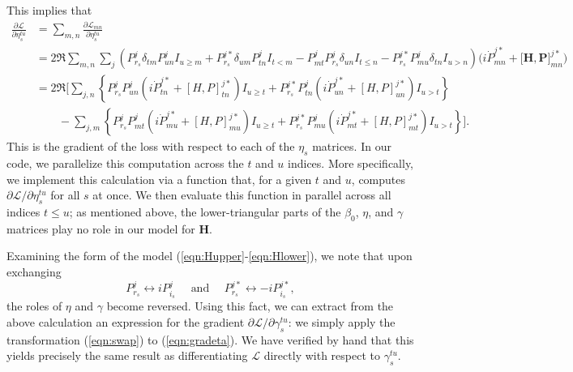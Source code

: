 \documentclass[10pt]{article}
\begin{document}
This implies that
\begin{subequations}
\label{eqn:gradeta}
\begin{align}
\frac{\partial \mathcal{L}}{\partial \eta_{s}^{tu}} &= \sum_{m,n} \frac{\partial \mathcal{L}_{mn}}{\partial \eta_{s}^{tu}} \nonumber \\
&= 2 \Re \sum_{m,n} \sum_{j} \left( P_{r_s}^j \delta_{tm} P^j_{un} I_{u \geq m} + P_{r_s}^{j\ast} \delta_{um} P^j_{tn}  I_{t < m} - P^j_{mt} P_{r_s}^j  \delta_{un} I_{t \leq n} - P_{r_s}^{j\ast} P_{mu}^j \delta_{tn} I_{u>n} \right) \biggl( i  \dot{P}^{j \ast}_{mn}
    + \big [  \mathbf{H} , \mathbf{P} \big]^{j \ast}_{mn} \biggr) \nonumber \\
    &= 2 \Re \biggl[ \sum_{j,n} \left\{ P_{r_s}^j P_{un}^j \left( i \dot{P}^{j\ast}_{tn} + [H,P]^{j\ast}_{tn} \right) I_{u \geq t}
     + P_{r_s}^{j \ast} P_{tn}^j  \left( i \dot{P}^{j\ast}_{un} + [H,P]^{j\ast}_{un} \right) I_{u > t} \right\} \\
  &\quad \quad - \sum_{j,m} \left\{ P_{r_s}^j P_{mt}^j \left( i \dot{P}^{j\ast}_{mu} + [H,P]^{j\ast}_{mu} \right) I_{u \geq t}
    + P_{r_s}^{j \ast} P_{mu}^j \left( i \dot{P}^{j \ast}_{mt} + 
     [H,P]^{j \ast}_{mt} \right) I_{u>t} \right\} \biggr].
\end{align}
\end{subequations}
This is the gradient of the loss with respect to each of the $\eta_s$ matrices.  In our code, we parallelize this computation across the $t$ and $u$ indices.  More specifically, we implement this calculation via a function that, for a given $t$ and $u$, computes $\partial \mathcal{L} / \partial \eta_s^{tu}$ for all $s$ at once.  We then evaluate this function in parallel across all indices $t \leq u$; as mentioned above, the lower-triangular parts of the $\beta_0$, $\eta$, and $\gamma$ matrices play no role in our model for $\mathbf{H}$.

Examining the form of the model (\ref{eqn:Hupper}-\ref{eqn:Hlower}), we note that upon exchanging
\begin{equation}
\label{eqn:swap}
P_{r_s}^j \longleftrightarrow i P_{i_s}^j \quad \text{ and } \quad P_{r_s}^{j\ast} \longleftrightarrow -i P_{i_s}^{j\ast},
\end{equation}
the roles of $\eta$ and $\gamma$ become reversed.  Using this fact, we can extract from the above calculation an expression for the gradient $\partial \mathcal{L} / \partial \gamma_s^{tu}$: we simply apply the transformation (\ref{eqn:swap}) to (\ref{eqn:gradeta}).  We have verified by hand that this yields precisely the same result as differentiating $\mathcal{L}$ directly with respect to $\gamma_s^{tu}$.
\end{document}
